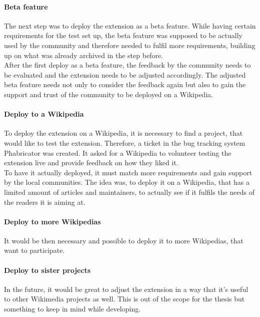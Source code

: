   \paragraph{Beta feature}
  The next step was to deploy the extension as a beta feature. While having certain requirements for the test set up, the beta feature was supposed to be actually used by the community and therefore needed to fulfil more requirements, building up on what was already archived in the step before. \\
  After the first deploy as a beta feature, the feedback by the community needs to be evaluated and the extension needs to be adjusted accordingly. The adjusted beta feature needs not only to consider the feedback again but also to gain the support and trust of the community to be deployed on a Wikipedia.

  \paragraph{Deploy to a Wikipedia}
  To deploy the extension on a Wikipedia, it is necessary to find a project, that would like to test the extension. Therefore, a ticket in the bug tracking system Phabricator was created. It asked for a Wikipedia to volunteer testing the extension live and provide feedback on how they liked it. \\
  To have it actually deployed, it must match more requirements and gain support by the local communities. The idea was, to deploy it on a Wikipedia, that has a limited amount of articles and maintainers, to actually see if it fulfils the needs of the readers it is aiming at. 

  \paragraph{Deploy to more Wikipedias}
  It would be then necessary and possible to deploy it to more Wikipedias, that want to participate. 

  \paragraph{Deploy to sister projects}
  In the future, it would be great to adjust the extension in a way that it's useful to other Wikimedia projects as well. This is out of the scope for the thesis but something to keep in mind while developing. 